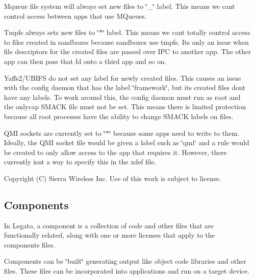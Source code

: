 \begin{DoxyItemize}
\item Mqueue file system will always set new files to \char`\"{}\+\_\+\char`\"{} label. This means we can\textquotesingle{}t control access between apps that use M\+Queues.
\item Tmpfs always sets new files to \char`\"{}$\ast$\char`\"{} label. This means we can\textquotesingle{}t totally control access to files created in sandboxes because sandboxes use tmpfs. It\textquotesingle{}s only an issue when file descriptors for the created files are passed over I\+P\+C to another app. The other app can then pass that fd onto a third app and so on.
\item Yaffs2/\+U\+B\+I\+F\+S do not set any label for newly created files. This causes an issue with the config daemon that has the label \char`\"{}framework\char`\"{}, but its created files don\textquotesingle{}t have any labels. To work around this, the config daemon must run as root and the \textquotesingle{}onlycap\textquotesingle{} S\+M\+A\+C\+K file must not be set. This means there is limited protection because all root processes have the ability to change S\+M\+A\+C\+K labels on files.
\item Q\+M\+I sockets are currently set to \char`\"{}$\ast$\char`\"{} because some apps need to write to them. Ideally, the Q\+M\+I socket file would be given a label such as \char`\"{}qmi\char`\"{} and a rule would be created to only allow access to the app that requires it. However, there currently isn\textquotesingle{}t a way to specify this in the xdef file.
\end{DoxyItemize}





Copyright (C) Sierra Wireless Inc. Use of this work is subject to license. \hypertarget{basicComponents}{}\subsection{Components}\label{basicComponents}
In Legato, a component is a collection of code and other files that are functionally related, along with one or more licenses that apply to the components\textquotesingle{} files.

Components can be \char`\"{}built\char`\"{} generating output like object code libraries and other files. These files can be incorporated into applications and run on a target device.

